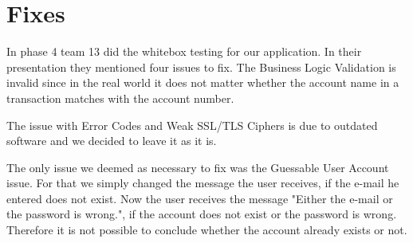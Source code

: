 \chapter{Fixes}

In phase 4 team 13 did the whitebox testing for our application. In their presentation they mentioned four issues to fix. The Business Logic Validation is invalid since in the real world it does not matter whether the account name in a transaction matches with the account number.

The issue with Error Codes and Weak SSL/TLS Ciphers is due to outdated software and we decided to leave it as it is.

The only issue we deemed as necessary to fix was the Guessable User Account issue. For that we simply changed the message the user receives, if the e-mail he entered does not exist. Now the user receives the message "Either the e-mail or the password is wrong.", if the account does not exist or the password is wrong. Therefore it is not possible to conclude whether the account already exists or not.